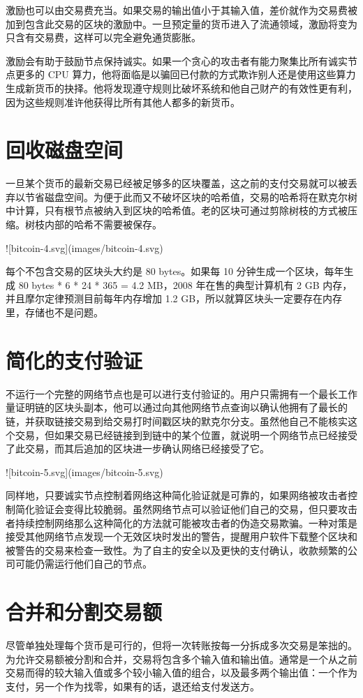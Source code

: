 \documentclass{article}
\begin{document}
激励也可以由交易费充当。如果交易的输出值小于其输入值，差价就作为交易费被加到包含此交易的区块的激励中。一旦预定量的货币进入了流通领域，激励将变为只含有交易费，这样可以完全避免通货膨胀。

激励会有助于鼓励节点保持诚实。如果一个贪心的攻击者有能力聚集比所有诚实节点更多的 CPU 算力，他将面临是以骗回已付款的方式欺诈别人还是使用这些算力生成新货币的抉择。他将发现遵守规则比破坏系统和他自己财产的有效性更有利，因为这些规则准许他获得比所有其他人都多的新货币。

\section{回收磁盘空间}
一旦某个货币的最新交易已经被足够多的区块覆盖，这之前的支付交易就可以被丢弃以节省磁盘空间。为便于此而又不破坏区块的哈希值，交易的哈希将在默克尔树\cite{Merkle}\cite{Massias}\cite{Stornetta}中计算，只有根节点被纳入到区块的哈希值。老的区块可通过剪除树枝的方式被压缩。树枝内部的哈希不需要被保存。

![bitcoin-4.svg](images/bitcoin-4.svg)

每个不包含交易的区块头大约是 80 bytes。如果每 10 分钟生成一个区块，每年生成 80 bytes * 6 * 24 * 365 = 4.2 MB，2008 年在售的典型计算机有 2 GB 内存，并且摩尔定律预测目前每年内存增加 1.2 GB，所以就算区块头一定要存在内存里，存储也不是问题。

\section{简化的支付验证}
不运行一个完整的网络节点也是可以进行支付验证的。用户只需拥有一个最长工作量证明链的区块头副本，他可以通过向其他网络节点查询以确认他拥有了最长的链，并获取链接交易到给交易打时间戳区块的默克尔分支。虽然他自己不能核实这个交易，但如果交易已经链接到到链中的某个位置，就说明一个网络节点已经接受了此交易，而其后追加的区块进一步确认网络已经接受了它。

![bitcoin-5.svg](images/bitcoin-5.svg)

同样地，只要诚实节点控制着网络这种简化验证就是可靠的，如果网络被攻击者控制简化验证会变得比较脆弱。虽然网络节点可以验证他们自己的交易，但只要攻击者持续控制网络那么这种简化的方法就可能被攻击者的伪造交易欺骗。一种对策是接受其他网络节点发现一个无效区块时发出的警告，提醒用户软件下载整个区块和被警告的交易来检查一致性。为了自主的安全以及更快的支付确认，收款频繁的公司可能仍需运行他们自己的节点。

\section{合并和分割交易额}
尽管单独处理每个货币是可行的，但将一次转账按每一分拆成多次交易是笨拙的。为允许交易额被分割和合并，交易将包含多个输入值和输出值。通常是一个从之前交易而得的较大输入值或多个较小输入值的组合，以及最多两个输出值：一个作为支付，另一个作为找零，如果有的话，退还给支付发送方。
\end{document}
